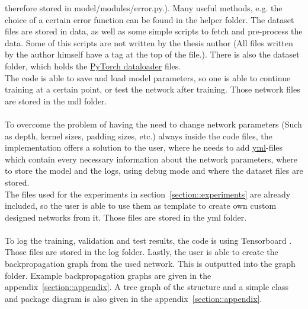   therefore stored in model/modules/error.py.).
  Many useful methods, e.g. the choice of a certain error function can be found in the helper folder. The dataset files are stored in 
  data, as well as some simple scripts to fetch and pre-process the data. Some of this scripts are not written by the thesis author (All files written by the 
  author himself have a tag at the top of the file.). There is also the dataset folder, which holds the \href{https://pytorch.org/docs/stable/
  data.html}{PyTorch dataloader} files.
  \\
  The code is able to save and load model parameters, so one is able to continue training at a certain point, or test the network
  after training. Those network files are stored in the mdl folder.
  \\\\
  To overcome the problem of having the need to change network parameters (Such as depth, kernel sizes, padding sizes, etc.) always inside the
  code files, the implementation offers a solution to the user, where he needs to add \href{https://yaml.org/}{yml}-files which contain every necessary 
  information about the network parameters, where to store the model and the logs, using debug mode and where the dataset files are stored.\\
  The files used for the experiments in section~\ref{section::experiments} are already included, so the user is able to use them as template to create own custom
  designed networks from it. Those files are stored in the yml 
  folder.
  \\\\
  To log the training, validation and test results, the code is using Tensorboard \cite{tensorflow2015}. Those files are stored in the log folder.
  Lastly, the user is able to create the backpropagation graph from the used network. This is outputted into the graph folder. Example backpropagation graphs
  are given in the appendix~\ref{section::appendix}.
  A tree graph of the structure and a simple class and package diagram is also given in the appendix~\ref{section::appendix}.
  
